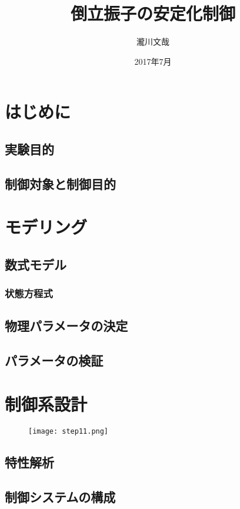\documentclass[a4j,11pt,twoside]{jbook}
\begin{document}
\title{倒立振子の安定化制御}
\author{瀧川文哉}
\date{2017年7月}
\maketitle
\tableofcontents
\listoffigures
\listoftables
\cleardoublepage
{}
\chapter{はじめに}
\section{実験目的}
\section{制御対象と制御目的}
\chapter{モデリング}
\section{数式モデル}
\subsection{状態方程式}
\section{物理パラメータの決定}
\section{パラメータの検証}

\chapter{制御系設計}
\begin{figure}
	\centering
	\texttt{[image: step11.png]}
	\caption{}
	\label{fig:step11}
\end{figure}
\section{特性解析}
\section{制御システムの構成}
\end{document}
